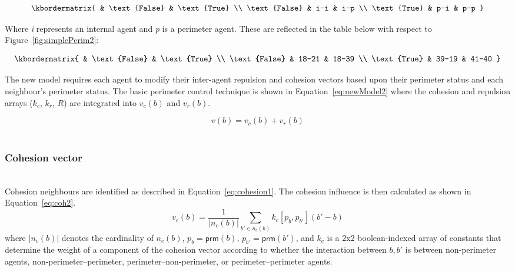 \documentclass[12pt,a4paper]{IEEEtran}
\newcommand{\prm}{\mathsf{prm}}
\newcommand{\kc}{\mathit{k_c}}
\newcommand{\kr}{\mathit{k_r}}
\newcommand{\rb}{\mathit{R}}
\begin{document}
\[
  \kbordermatrix{
                   & \text{False} & \text{True} \\
    \text{False}   & i-i   & i-p  \\
    \text{True}    & p-i   & p-p
  }
\]

Where \emph{i} represents an internal agent and \emph{p} is a perimeter agent. These are reflected in the table below with respect to Figure~\ref{fig:simplePerim2}:

\[
  \kbordermatrix{
                   & \text{False} & \text{True}  \\
    \text{False}   & 18-21        & 18-39 \\
    \text{True}    & 39-19        & 41-40
  }
\]

The new model requires each agent to modify their inter-agent repulsion and cohesion vectors based upon their perimeter status and each neighbour's perimeter status. The basic perimeter control technique is shown in Equation~\ref{eq:newModel2} where the cohesion and repulsion arrays ($\kc$, $\kr$, $\rb$) are integrated into $v_c(b)$ and $v_r(b)$.

\begin{equation}\label{eq:newModel2}
v(b) = v_c(b) + v_r(b)
\end{equation}\\

\subsubsection{Cohesion vector}~\\
Cohesion neighbours are identified as described in Equation~\ref{eq:cohesion1}. The cohesion influence is then calculated as shown in Equation~\ref{eq:coh2}.
\begin{equation}\label{eq:coh2}
	v_c(b) = \frac{1}{|n_c(b)|} \sum_{b' \in n_c(b)} \kc[p_b, p_{b'}] (b' - b)
\end{equation}
where $|n_c(b)|$ denotes the cardinality of $n_c(b)$, $p_b = \prm(b)$, $p_{b'} 
= \prm(b')$, and 
$\kc$ is a 2x2 boolean-indexed array of constants that determine the weight
of a component of the cohesion vector according to
whether the interaction between $b,b'$ is between non-perimeter agents,
non-perimeter--perimeter, perimeter--non-perimeter, or perimeter--perimeter
agents.\\
\end{document}
